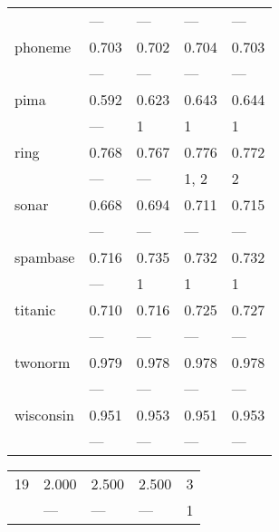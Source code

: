 \begin{tabular}{lllll}
                  & ---   & ---   & ---   & ---   \\
 phoneme          & 0.703 & 0.702 & 0.704 & 0.703 \\
                  & ---   & ---   & ---   & ---   \\
 pima             & 0.592 & 0.623 & 0.643 & 0.644 \\
                  & ---   & 1     & 1     & 1     \\
 ring             & 0.768 & 0.767 & 0.776 & 0.772 \\
                  & ---   & ---   & 1, 2  & 2     \\
 sonar            & 0.668 & 0.694 & 0.711 & 0.715 \\
                  & ---   & ---   & ---   & ---   \\
 spambase         & 0.716 & 0.735 & 0.732 & 0.732 \\
                  & ---   & 1     & 1     & 1     \\
 titanic          & 0.710 & 0.716 & 0.725 & 0.727 \\
                  & ---   & ---   & ---   & ---   \\
 twonorm          & 0.979 & 0.978 & 0.978 & 0.978 \\
                  & ---   & ---   & ---   & ---   \\
 wisconsin        & 0.951 & 0.953 & 0.951 & 0.953 \\
                  & ---   & ---   & ---   & ---   \\
\bottomrule
\end{tabular}
\begin{tabular}{llllr}
\toprule
 19 & 2.000 & 2.500 & 2.500 & 3 \\
    & ---   & ---   & ---   & 1 \\
\bottomrule
\end{tabular}
